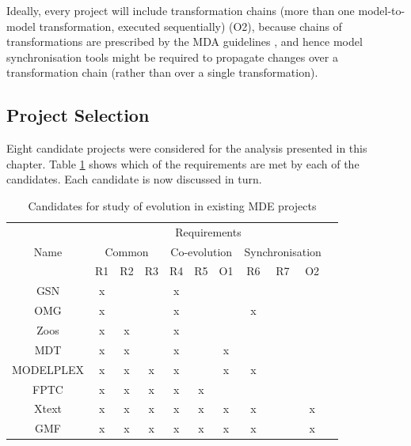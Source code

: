Ideally, every project will include transformation chains (more than one model-to-model transformation, executed sequentially) (O2), because chains of transformations are prescribed by the MDA guidelines \cite{kleppe03mda}, and hence model synchronisation tools might be required to propagate changes over a transformation chain (rather than over a single transformation).


\subsection{Project Selection}
\label{subsec:project_selection}
Eight candidate projects were considered for the analysis presented in this chapter. Table \ref{tab:candidates} shows which of the requirements are met by each of the candidates. Each candidate is now discussed in turn.

\begin{table}
	\centering
	\begin{tabular}{|c||c|c|c||c|c|c||c|c|c|c|}
		\hline
		\multirow{3}{*}{Name} & \multicolumn{9}{|c|}{Requirements} \\
		\cline{2-10}
		          & \multicolumn{3}{|c||}{Common} & \multicolumn{3}{|c||}{Co-evolution} & \multicolumn{3}{|c|}{Synchronisation} \\
		\cline{2-10}
		          & R1 & R2 & R3 & R4 & R5 & O1 & R6 & R7 & O2 \\
		\hline                                         
		GSN       & x  &    &    & x  &    &    &    &    &    \\
		\hline                                         
		OMG       & x  &    &    & x  &    &    & x  &    &    \\
		\hline                                         
		Zoos      & x  & x  &    & x  &    &    &    &    &    \\
		\hline                                         
		MDT       & x  & x  &    & x  &    & x  &    &    &    \\
		\hline                                         
		MODELPLEX & x  & x  & x  & x  &    & x  & x  &    &    \\
		\hline                                         
		FPTC      & x  & x  & x  & x  & x  &    &    &    &    \\
		\hline                                         
		Xtext     & x  & x  & x  & x  & x  & x  & x  &    & x  \\
		\hline                                         
		GMF       & x  & x  & x  & x  & x  & x  & x  &    & x  \\
		\hline
	\end{tabular}
	\caption{Candidates for study of evolution in existing MDE projects}
	\label{tab:candidates}
\end{table}


